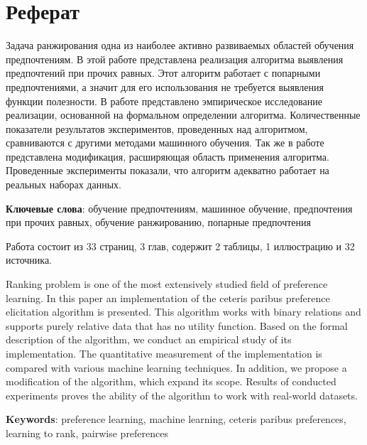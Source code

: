 \chapter*{Реферат}

Задача ранжирования одна из наиболее активно развиваемых областей обучения предпочтениям. В этой работе представлена реализация алгоритма выявления предпочтений при прочих равных. Этот алгоритм работает с попарными предпочтениями, а значит для его использования не требуется выявления функции полезности. В работе представлено эмпирическое исследование реализации, основанной на формальном определении алгоритма. Количественные показатели результатов экспериментов, проведенных над алгоритмом, сравниваются с другими методами машинного обучения. Так же в работе представлена модификация, расширяющая область применения алгоритма. Проведенные эксперименты показали, что алгоритм адекватно работает на реальных наборах данных.

\textbf{Ключевые слова}: обучение предпочтениям, машинное обучение, предпочтения при прочих равных, обучение ранжированию, попарные предпочтения 

\vspace{2em}

Работа состоит из 33 страниц, 3 глав, содержит 2 таблицы, 1 иллюстрацию и 32 источника. 

\newpage


Ranking problem is one of the most extensively studied field of preference learning. In this paper an implementation of the ceteris paribus preference elicitation algorithm is presented. This algorithm works with binary relations and supports purely relative data that has no utility function. Based on the formal description of the algorithm, we conduct an empirical study of its implementation. The quantitative measurement of the implementation is compared with various machine learning techniques. In addition, we propose a modification of the algorithm, which expand its scope. Results of conducted experiments proves the ability of the algorithm to work with real-world datasets.

\textbf{Keywords}: preference learning, machine learning, ceteris paribus preferences, learning to rank, pairwise preferences